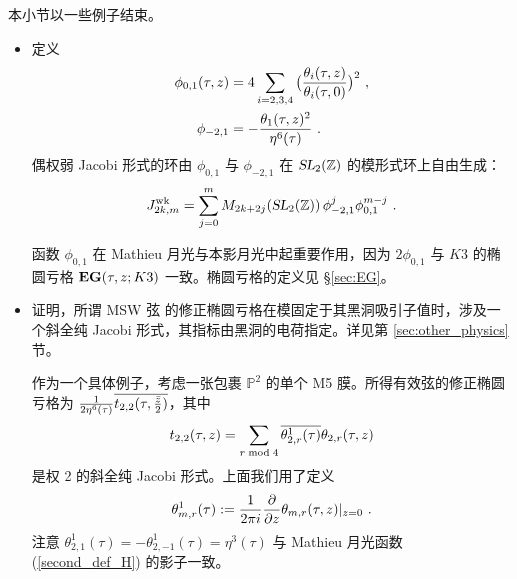 \documentclass[11pt,a4paper,fontset=windows]{ctexart}
\numberwithin{equation}{section}
\newcommand{\SL}{\operatorname{\textsl{SL}}}      %
\newcommand{\wk}{{\rm wk}}
\newcommand{\ZZ}{\mathbb{Z}}
\newcommand{\PP}{\mathbb{P}}
\newcommand{\xmod}{{\rm \;mod\;}}
\def\pa{\partial}
\def\t{\tau}
\def\th{\theta}
\newcommand{\be}{\begin{equation}}
\newcommand{\ee}{\end{equation}}
\newcommand{\eq}[1]{(\ref{#1})}
\begin{document}
本小节以一些例子结束。
\begin{itemize}
\item 
定义
\begin{gather}
\begin{split}
\label{phi01}
\phi_{0,1}(\t,z)&=4 \sum_{i=2,3,4}\big(\frac{\th_i(\t,z)}{\th_i(\t,0)}\big)^2~,  \\
\phi_{-2,1} &= -{\th_1(\t,z)^2\over \eta^6(\t)}~. 
\end{split}
\end{gather}
偶权弱 Jacobi 形式的环由 $ \phi_{0,1}$ 与 $ \phi_{-2,1}$ 在 $\SL_2(\ZZ)$ 的模形式环上自由生成：
\be
J^{\wk}_{2k,m} = \sum_{j=0}^{m} M_{2k+2j}(\SL_2(\ZZ)) \,   \phi_{-2,1}^j \phi_{0,1}^{m-j}~. 
\ee


函数 $  \phi_{0,1}$ 在 Mathieu 月光与本影月光中起重要作用，因为 $ 2 \phi_{0,1}$ 与 $K3$ 的椭圆亏格 ${\bf EG}(\t,z;K3)$ 一致。椭圆亏格的定义见 \S\ref{sec:EG}。

\item{\cite{Cheng:2017dlj} 证明，所谓 MSW 弦 \cite{Maldacena:1997de} 的修正椭圆亏格在模固定于其黑洞吸引子值时，涉及一个斜全纯 Jacobi 形式，其指标由黑洞的电荷指定。详见第 \ref{sec:other_physics} 节。}


作为一个具体例子，考虑一张包裹 $\PP^2$ 的单个 M5 膜。所得有效弦的修正椭圆亏格为 ${1\over 2 \eta^6(\tau)}\overline{t_{2,2}(\tau, {\bar z\over 2})}$，其中 $$t_{2,2}(\t,z) = \sum_{r\xmod{4}} \overline{\theta^1_{2,r}(\t)} \theta_{2,r}(\t,z) $$ 是权 2 的斜全纯 Jacobi 形式。上面我们用了定义
\begin{equation}
\theta_{m,r}^1(\tau) := {1\over 2\pi i} {\pa\over\pa z}\theta_{m,r}(\tau,z)\lvert_{z=0}~.
\end{equation}
注意 $\theta^1_{2,1}(\t) = -\theta^1_{2,-1}(\t) = \eta^3(\tau)$ 与 Mathieu 月光函数 \eq{second_def_H} 的影子一致。



\end{itemize}
\end{document}
